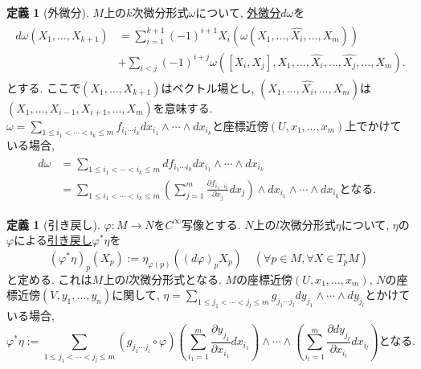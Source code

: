 \documentclass[dvipdfmx,a4paper,11pt]{article}
\theoremstyle{definition}
\newtheorem{dfn}[thm]{定義}
\newcommand{\pdrv}[2]{\frac{\partial #1}{\partial #2}}
\begin{document}
  \begin{tcolorbox}[
    colback = white,
    colframe = green!35!black,
    fonttitle = \bfseries,
    breakable = true]
\begin{dfn}[外微分]
$M$上の$k$次微分形式$\omega$について, \underline{外微分$d \omega$}を
\begin{align*}
\begin{split}
d\omega(X_1, \ldots, X_{k+1})
&=
\sum_{i=1}^{k+1}(-1)^{i+1}X_i(\omega(X_1, \ldots,\widehat{X_{i}}, \ldots, X_{m}))\\
&+\sum_{i<j}(-1)^{i+j}\omega([X_i, X_j], X_1, \ldots, \widehat{X_{i}},  \ldots, \widehat{X_{j}}, \ldots, X_{m}).
\end{split}
\end{align*}
とする.  ここで$(X_1, \ldots, X_{k+1})$はベクトル場とし, $(X_1, \ldots,\widehat{X_{i}}, \ldots, X_{m})$は$(X_1, \ldots,X_{i-1}, X_{i+1}, \ldots, X_{m})$を意味する.
$\omega = \sum_{ 1 \le i_1< \cdots < i_k\le m }f_{i_1 \cdots i_k}d x_{i_1}\wedge \cdots \wedge dx_{i_k}$と座標近傍$(U, x_1, \ldots, x_m)$上でかけている場合, 
\begin{align*}
\begin{split}
d\omega
&=
 \sum_{ 1 \le i_1< \cdots < i_k\le m }
 df_{i_1 \cdots i_k}d x_{i_1} \wedge \cdots \wedge dx_{i_k}\\
& =  \sum_{ 1 \le i_1< \cdots < i_k\le m }\left(\sum_{j=1}^{m}\pdrv{f_{i_1 \cdots i_k}}{x_{j}}d x_{j}\right)\wedge d x_{i_1} \wedge \cdots \wedge dx_{i_k}
\text{となる. }
\end{split}
\end{align*}

    \end{dfn}
    \end{tcolorbox}
      \begin{tcolorbox}[
    colback = white,
    colframe = green!35!black,
    fonttitle = \bfseries,
    breakable = true]
\begin{dfn}[引き戻し]

 $\varphi : M \rightarrow N$を$C^{\infty}$写像とする. $N$上の$l$次微分形式$\eta$について, $\eta$の$\varphi$による\underline{引き戻し$\varphi^{*}\eta$}を
$$
(\varphi^{*}\eta)_{p}(X_{p}) := \eta_{\varphi(p)}((d\varphi)_{p} X_{p}) \quad (\forall p \in M, \forall X \in T_{p}M)
$$
と定める. これは$M$上の$l$次微分形式となる. 
$M$の座標近傍$(U, x_1, \ldots, x_m)$, $N$の座標近傍$(V, y_1, \ldots, y_n)$に関して, $\eta = \sum_{ 1 \le j_1< \cdots < j_l\le m }g_{j_1 \cdots j_l}d y_{j_1} \wedge \cdots \wedge dy_{j_l}$とかけている場合, 
$$
\varphi^{*}\eta:= 
\sum_{ 1 \le j_1< \cdots < j_l\le m }(g_{j_1 \cdots j_l}\circ \varphi )
\left(\sum_{i_1 =1}^{m}\pdrv{ y_{j_1}}{x_{i_1}} dx_{i_1} \right)\wedge \cdots \wedge 
\left(\sum_{i_l =1}^{m}\pdrv{dy_{j_l}}{x_{i_l}} dx_{i_l}\right)\text{となる.}
$$
    \end{dfn}
    \end{tcolorbox}
 
\end{document}
